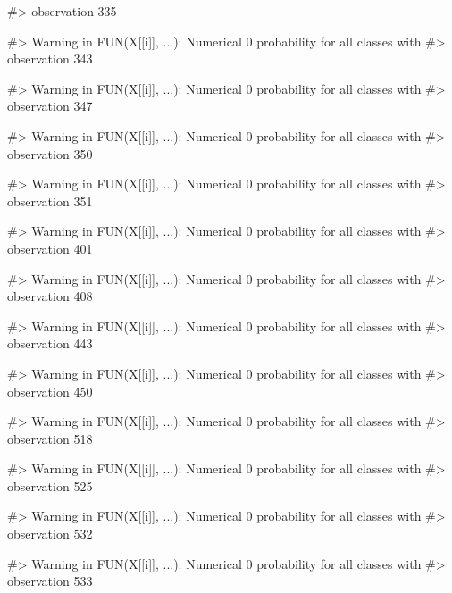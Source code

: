 \begin{Schunk}
\begin{Soutput}
#> observation 335
\end{Soutput}
\begin{Soutput}
#> Warning in FUN(X[[i]], ...): Numerical 0 probability for all classes with
#> observation 343
\end{Soutput}
\begin{Soutput}
#> Warning in FUN(X[[i]], ...): Numerical 0 probability for all classes with
#> observation 347
\end{Soutput}
\begin{Soutput}
#> Warning in FUN(X[[i]], ...): Numerical 0 probability for all classes with
#> observation 350
\end{Soutput}
\begin{Soutput}
#> Warning in FUN(X[[i]], ...): Numerical 0 probability for all classes with
#> observation 351
\end{Soutput}
\begin{Soutput}
#> Warning in FUN(X[[i]], ...): Numerical 0 probability for all classes with
#> observation 401
\end{Soutput}
\begin{Soutput}
#> Warning in FUN(X[[i]], ...): Numerical 0 probability for all classes with
#> observation 408
\end{Soutput}
\begin{Soutput}
#> Warning in FUN(X[[i]], ...): Numerical 0 probability for all classes with
#> observation 443
\end{Soutput}
\begin{Soutput}
#> Warning in FUN(X[[i]], ...): Numerical 0 probability for all classes with
#> observation 450
\end{Soutput}
\begin{Soutput}
#> Warning in FUN(X[[i]], ...): Numerical 0 probability for all classes with
#> observation 518
\end{Soutput}
\begin{Soutput}
#> Warning in FUN(X[[i]], ...): Numerical 0 probability for all classes with
#> observation 525
\end{Soutput}
\begin{Soutput}
#> Warning in FUN(X[[i]], ...): Numerical 0 probability for all classes with
#> observation 532
\end{Soutput}
\begin{Soutput}
#> Warning in FUN(X[[i]], ...): Numerical 0 probability for all classes with
#> observation 533
\end{Soutput}
\begin{Soutput}

\end{Soutput}
\end{Schunk}
